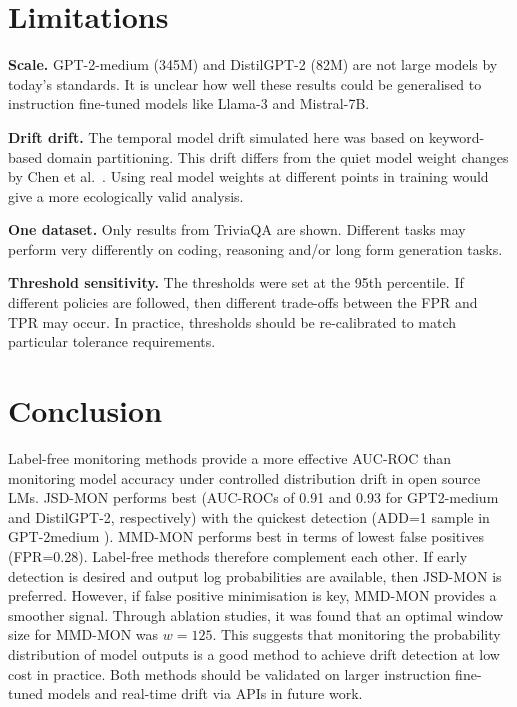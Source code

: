 \documentclass[12pt,a4paper]{article}
\begin{document}
\section{Limitations}
\label{sec:limitations}

\textbf{Scale.}  GPT-2-medium (345M) and DistilGPT-2 (82M) are not large models by today's standards. It is unclear how well these results could be generalised to instruction fine-tuned models like Llama-3 and Mistral-7B.

\textbf{Drift drift.} The temporal model drift simulated here was based on keyword-based domain partitioning. This drift differs from the quiet model weight changes by Chen et al.~\cite{Chen2023}. Using real model weights at different points in training would give a more ecologically valid analysis.

\textbf{One dataset.} Only results from TriviaQA are shown. Different tasks may perform very differently on coding, reasoning and/or long form generation tasks. 

\textbf{Threshold sensitivity.}  The thresholds were set at the 95th percentile. If different policies are followed, then different trade-offs between the FPR and TPR may occur. In practice, thresholds should be re-calibrated to match particular tolerance requirements.

\section{Conclusion}
\label{sec:conclusion}

Label-free monitoring methods provide a more effective AUC-ROC than monitoring model accuracy under controlled distribution drift in open source LMs. JSD-MON performs best (AUC-ROCs of 0.91 and 0.93 for GPT2-medium and DistilGPT-2, respectively) with the quickest detection (ADD=1 sample in GPT-2medium ). MMD-MON performs best in terms of lowest false positives (FPR=0.28). Label-free methods therefore complement each other. If early detection is desired and output log probabilities are available, then JSD-MON is preferred. However, if false positive minimisation is key, MMD-MON provides a smoother signal. Through ablation studies, it was found that an optimal window size for MMD-MON was $w\!=\!125$. This suggests that monitoring the probability distribution of model outputs is a good method to achieve drift detection at low cost in practice. Both methods should be validated on larger instruction fine-tuned models and real-time drift via APIs in future work.





\end{document}
